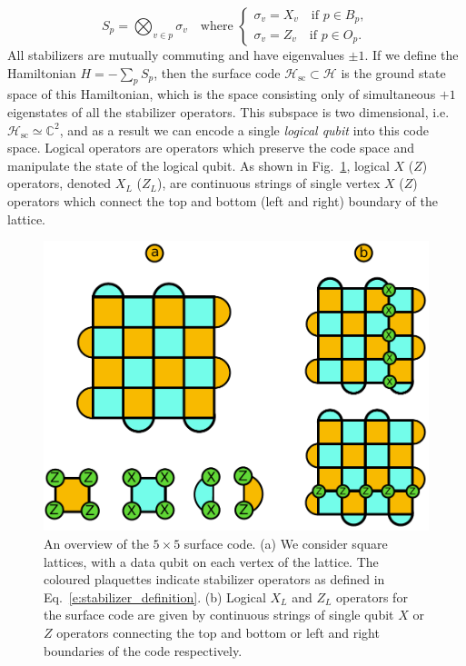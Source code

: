 \documentclass[twocolumn,preprintnumbers,amsmath,amssymb,notitlepage,nofootinbib,longbibliography,superscriptaddress,aps,pra,10pt]{revtex4-1}
\begin{document}
	\begin{equation}\label{e:stabilizer_definition}
		S_p = \bigotimes_{v\in p} \sigma_v \quad \text{where }
		\begin{cases}
			\sigma_v = X_v \quad \text{if } p \in B_p,\\
			\sigma_v = Z_v \quad \text{if } p \in O_p.
		\end{cases}
	\end{equation}
	All stabilizers are mutually commuting and have eigenvalues $\pm 1$.
	If we define the Hamiltonian $H = -\sum_p S_p$, then the surface code $\mathcal{H}_\mathrm{sc} \subset \mathcal{H}$ is the ground state space of this Hamiltonian, which is the space consisting only of simultaneous $+1$ eigenstates of all the stabilizer operators.
	This subspace is two dimensional, i.e. $\mathcal{H}_\mathrm{sc} \simeq \mathbb{C}^2$, and as a result we can encode a single \textit{logical qubit} into this code space.
	Logical operators are operators which preserve the code space and manipulate the state of the logical qubit.
	As shown in Fig.~\ref{f:surface_code}, logical $X$ ($Z$) operators, denoted $X_L$ ($Z_L$), are continuous strings of single vertex $X$ ($Z$) operators which connect the top and bottom (left and right) boundary of the lattice.

	\begin{figure}
		\centering
		\includegraphics[width=0.8\linewidth]{figures/surface_code.pdf}
		\caption{
			An overview of the $5 \times 5$ surface code.
			(a) We consider square lattices, with a data qubit on each vertex of the lattice.
			The coloured plaquettes indicate stabilizer operators as defined in Eq.~\eqref{e:stabilizer_definition}.
			(b) Logical $X_L$ and $Z_L$ operators for the surface code are given by continuous strings of single qubit $X$ or $Z$ operators connecting the top and bottom or left and right boundaries of the code respectively.
		}
		\label{f:surface_code}
	\end{figure}
\end{document}
